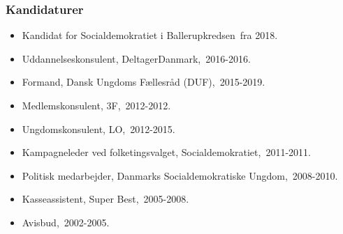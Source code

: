 \documentclass[11pt, a4paper]{awesome-cv}
\begin{document}
\begin{cvletter}
\subsubsection*{Kandidaturer}
\begin{itemize}
\item Kandidat for Socialdemokratiet i Ballerupkredsen fra 2018.
\end{itemize}
\begin{itemize}
\item Uddannelseskonsulent, DeltagerDanmark, 2016-2016.
\item Formand, Dansk Ungdoms Fællesråd (DUF), 2015-2019.
\item Medlemskonsulent, 3F, 2012-2012.
\item Ungdomskonsulent, LO, 2012-2015.
\item Kampagneleder ved folketingsvalget, Socialdemokratiet, 2011-2011.
\item Politisk medarbejder, Danmarks Socialdemokratiske Ungdom, 2008-2010.
\item Kasseassistent, Super Best, 2005-2008.
\item Avisbud, 2002-2005.
\end{itemize}
\end{cvletter}
\end{document}
